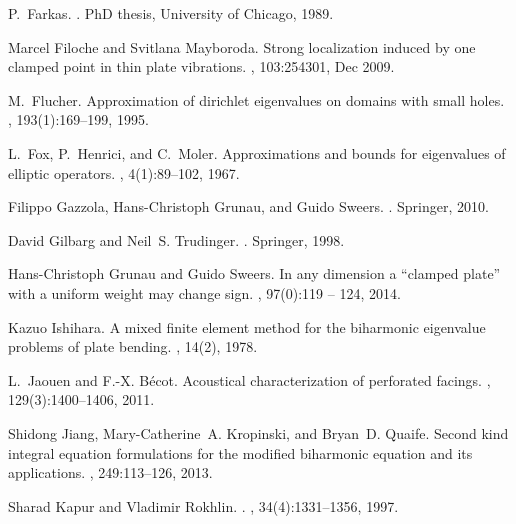 \documentclass[times]{article}
\begin{document}
\begin{thebibliography}{10}
P.~Farkas.
.
\newblock PhD thesis, University of Chicago, 1989.

Marcel Filoche and Svitlana Mayboroda.
\newblock Strong localization induced by one clamped point in thin plate
  vibrations.
, 103:254301, Dec 2009.

M.~Flucher.
\newblock Approximation of dirichlet eigenvalues on domains with small holes.
,
  193(1):169--199, 1995.

L.~Fox, P.~Henrici, and C.~Moler.
\newblock Approximations and bounds for eigenvalues of elliptic operators.
, 4(1):89--102, 1967.

Filippo Gazzola, Hans-Christoph Grunau, and Guido Sweers.
.
\newblock Springer, 2010.

David Gilbarg and Neil~S. Trudinger.
.
\newblock Springer, 1998.

Hans-Christoph Grunau and Guido Sweers.
\newblock In any dimension a ``clamped plate'' with a uniform weight may change
  sign.
, 97(0):119
  -- 124, 2014.

Kazuo Ishihara.
\newblock A mixed finite element method for the biharmonic eigenvalue problems
  of plate bending.
, 14(2), 1978.

L.~Jaouen and F.-X. B\'{e}cot.
\newblock Acoustical characterization of perforated facings.
,
  129(3):1400--1406, 2011.

Shidong Jiang, Mary-Catherine~A. Kropinski, and Bryan~D. Quaife.
\newblock Second kind integral equation formulations for the modified
  biharmonic equation and its applications.
, 249:113--126, 2013.

Sharad Kapur and Vladimir Rokhlin.
.
, 34(4):1331--1356, 1997.


\end{thebibliography}
\end{document}
